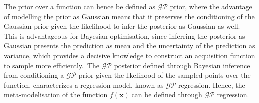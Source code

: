 The prior over a function can hence be defined as $\mathcal{GP}$ prior, where the advantage of modelling the prior as Gaussian means that it preserves the conditioning of the Gaussian prior given the likelihood to infer the posterior as Gaussian as well. This is advantageous for Bayesian optimisation, since inferring the posterior as Gaussian presents the prediction as mean and the uncertainty of the prediction as variance, which provides a decisive knowledge to construct an acquisition function to sample more efficiently.\
The $\mathcal{GP}$ posterior defined through Bayesian inference from conditioning a $\mathcal{GP}$ prior given the likelihood of the sampled points over the function, characterizes a regression model, known as $\mathcal{GP}$ regression. Hence, the meta-modelisation of the function $f(\bm{x})$ can be defined through $\mathcal{GP}$ regression. \\

 

